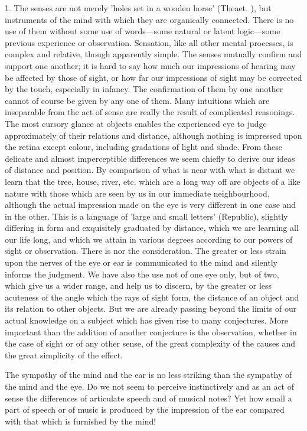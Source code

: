 \documentclass[11pt,letter]{article}
\begin{document}
\par  1. The senses are not merely 'holes set in a wooden horse' (Theaet. ), but instruments of the mind with which they are organically connected. There is no use of them without some use of words—some natural or latent logic—some previous experience or observation. Sensation, like all other mental processes, is complex and relative, though apparently simple. The senses mutually confirm and support one another; it is hard to say how much our impressions of hearing may be affected by those of sight, or how far our impressions of sight may be corrected by the touch, especially in infancy. The confirmation of them by one another cannot of course be given by any one of them. Many intuitions which are inseparable from the act of sense are really the result of complicated reasonings. The most cursory glance at objects enables the experienced eye to judge approximately of their relations and distance, although nothing is impressed upon the retina except colour, including gradations of light and shade. From these delicate and almost imperceptible differences we seem chiefly to derive our ideas of distance and position. By comparison of what is near with what is distant we learn that the tree, house, river, etc. which are a long way off are objects of a like nature with those which are seen by us in our immediate neighbourhood, although the actual impression made on the eye is very different in one case and in the other. This is a language of 'large and small letters' (Republic), slightly differing in form and exquisitely graduated by distance, which we are learning all our life long, and which we attain in various degrees according to our powers of sight or observation. There is nor the consideration. The greater or less strain upon the nerves of the eye or ear is communicated to the mind and silently informs the judgment. We have also the use not of one eye only, but of two, which give us a wider range, and help us to discern, by the greater or less acuteness of the angle which the rays of sight form, the distance of an object and its relation to other objects. But we are already passing beyond the limits of our actual knowledge on a subject which has given rise to many conjectures. More important than the addition of another conjecture is the observation, whether in the case of sight or of any other sense, of the great complexity of the causes and the great simplicity of the effect.

\par  The sympathy of the mind and the ear is no less striking than the sympathy of the mind and the eye. Do we not seem to perceive instinctively and as an act of sense the differences of articulate speech and of musical notes? Yet how small a part of speech or of music is produced by the impression of the ear compared with that which is furnished by the mind!
\end{document}
